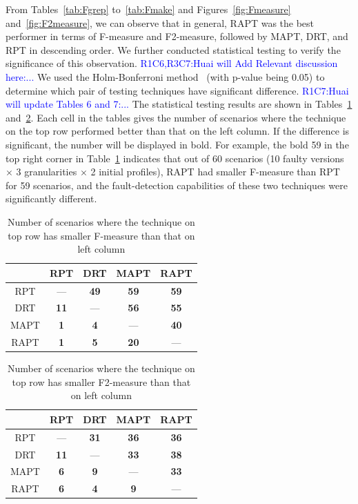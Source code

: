 \documentclass[10pt,journal,compsoc]{IEEEtran}
\begin{document}
From Tables~\ref{tab:Fgrep} to~\ref{tab:Fmake} and Figures~\ref{fig:Fmeasure} and~\ref{fig:F2measure}, we can observe that in general, RAPT was the best performer in terms of F-measure and F2-measure, followed by MAPT, DRT, and RPT in descending order. We further conducted statistical testing to verify the significance of this observation. \textcolor{blue}{R1C6,R3C7:Huai will Add Relevant discussion here:...} We used the Holm-Bonferroni method~\cite{Holm79} (with p-value being 0.05) to determine which pair of testing techniques have significant difference.  \textcolor{blue}{R1C7:Huai will update Tables 6 and 7:...} The statistical testing results are shown in Tables~\ref{tab:Fsta} and~\ref{tab:F2sta}. Each cell in the tables gives the number of scenarios where the technique on the top row performed better than that on the left column. If the difference is significant, the number will be displayed in bold. For example, the bold 59 in the top right corner in Table~\ref{tab:Fsta} indicates that out of 60 scenarios (10 faulty versions $\times$ 3 granularities $\times$ 2 initial profiles), RAPT had smaller F-measure than RPT for 59 scenarios, and the fault-detection capabilities of these two techniques were significantly different.

\begin{table}
\caption{Number of scenarios where the technique on top row has smaller F-measure than that on left column}
\label{tab:Fsta}
\centering
\begin{tabular}{|c|c|c|c|c|} \hline
			& RPT					& DRT					& MAPT				& RAPT				\\ \hline
RPT		& ---					& \textbf{49}	& \textbf{59}	& \textbf{59}	\\ \hline
DRT		& \textbf{11}	& ---					& \textbf{56}	& \textbf{55}	\\ \hline
MAPT	& \textbf{1}	& \textbf{4}	& ---					& \textbf{40}	\\ \hline
RAPT	& \textbf{1}	& \textbf{5}	& \textbf{20}	& ---					\\ \hline
\end{tabular}
\end{table}

\begin{table}
\caption{Number of scenarios where the technique on top row has smaller F2-measure than that on left column}
\label{tab:F2sta}
\centering
\begin{tabular}{|c|c|c|c|c|} \hline
			& RPT					& DRT					& MAPT				& RAPT				\\ \hline
RPT		& ---					& \textbf{31}	& \textbf{36}	& \textbf{36}	\\ \hline
DRT		& \textbf{11}	& ---					& \textbf{33}	& \textbf{38}	\\ \hline
MAPT	& \textbf{6}	& \textbf{9}	& ---					& \textbf{33}	\\ \hline
RAPT	& \textbf{6}	& \textbf{4}	& \textbf{9}	& ---					\\ \hline
\end{tabular}
\end{table}
\end{document}
